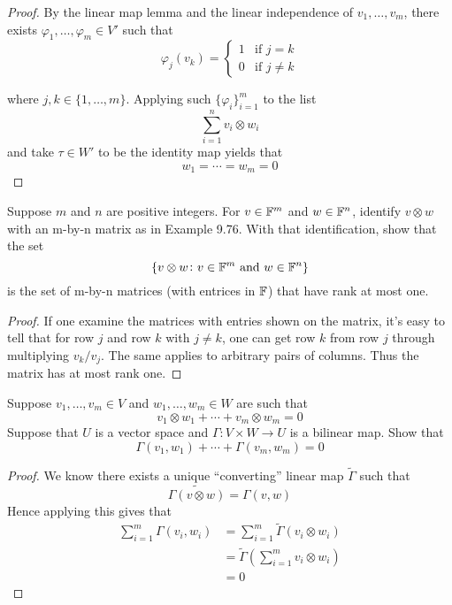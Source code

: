 \documentclass{extarticle}
\begin{document}
\begin{proof}
By the linear map lemma and the linear independence of \(v_1, \ldots, v_m\), there exists 
\(\varphi_1, \ldots, \varphi_m \in V'\) such that 
\[ \varphi_j(v_k) = \begin{cases}
    1 &\text{if } j = k \\ 
    0 &\text{if } j \neq k 
\end{cases}\]

where \(j, k \in \{1, \ldots, m\}\). Applying such \(\{\varphi_i\}_{i=1}^m\) to the list 
\[ \sum_{i=1}^{n} v_i \otimes w_i\]
and take \(\tau \in W'\) to be the identity map yields that 
\[w_1 = \cdots = w_m =  0\] 
\end{proof}


\begin{problem}{5}
    Suppose \(m\) and \(n\) are positive integers. For \(v \in \mathbb{F}^m\) and \(w \in \mathbb{F}^n\), 
    identify \(v \otimes w\) with an m-by-n matrix as in Example 9.76. With that identification, 
    show that the set 
    \[\{v \otimes w \colon v \in \mathbb{F}^m \text{ and } w \in \mathbb{F}^n\}\]
    is the set of m-by-n matrices (with entrices in \(\mathbb{F}\)) that have rank at most one. 
\end{problem}

\begin{proof}
If one examine the matrices with entries shown on the matrix, it's easy to tell that 
for row \(j\) and row \(k\) with \(j \neq k\), one can get row \(k\) from row \(j\) 
through multiplying \(v_k / v_j\). The same applies to arbitrary pairs of columns. Thus 
the matrix has at most rank one. 
\end{proof}


\begin{problem}{8}
    Suppose \(v_1, \ldots, v_m \in V\) and \(w_1, \ldots, w_m \in W\) are such that 
    \[ v_1 \otimes w_1 + \cdots + v_m \otimes w_m = 0\]
    Suppose that \(U\) is a vector space and \(\Gamma \colon V \times W \to U\) is a bilinear 
    map. Show that 
    \[ \Gamma(v_1, w_1) + \cdots + \Gamma(v_m, w_m) = 0\]
\end{problem}

\begin{proof}
We know there exists a unique ``converting'' linear map \(\tilde{\Gamma}\) such that 
\[\tilde{\Gamma(v \otimes w)} = \Gamma(v, w)\]
Hence applying this gives that 
\begin{align*}
    \sum_{i=1}^{m} \Gamma (v_i, w_i) 
    &= \sum_{i=1}^{m} \tilde{\Gamma}(v_i \otimes w_i) \\ 
    &= \tilde{\Gamma}( \sum_{i=1}^{m} v_i \otimes w_i) \\ 
    &= 0 
\end{align*}
\end{proof}
\end{document}
